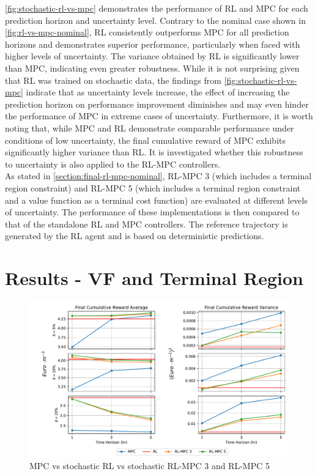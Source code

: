 \autoref{fig:stochastic-rl-vs-mpc} demonstrates the performance of RL and MPC for each prediction horizon and uncertainty level. Contrary to the nominal case shown in \ref{fig:rl-vs-mpc-nominal}, RL consistently outperforms MPC for all prediction horizons and demonstrates superior performance, particularly when faced with higher levels of uncertainty. The variance obtained by RL is significantly lower than MPC, indicating even greater robustness. While it is not surprising given that RL was trained on stochastic data, the findings from \autoref{fig:stochastic-rl-vs-mpc} indicate that as uncertainty levels increase, the effect of increasing the prediction horizon on performance improvement diminishes and may even hinder the performance of MPC in extreme cases of uncertainty. Furthermore, it is worth noting that, while MPC and RL demonstrate comparable performance under conditions of low uncertainty, the final cumulative reward of MPC exhibits significantly higher variance than RL. It is investigated whether this robustness to uncertainty is also applied to the RL-MPC controllers.\\
As stated in \autoref{section:final-rl-mpc-nominal}, RL-MPC 3 (which includes a terminal region constraint) and RL-MPC 5 (which includes a terminal region constraint and a value function as a terminal cost function) are evaluated at different levels of uncertainty. The performance of these implementations is then compared to that of the standalone RL and MPC controllers. The reference trajectory is generated by the RL agent and is based on deterministic predictions.

\section{Results - VF and Terminal Region}


\begin{figure}[H]
	\centering
	\includegraphics[width=\textwidth]{figures/stochastic_rl_vs_mpc_impl3.pdf}
	\caption{MPC vs stochastic RL vs stochastic RL-MPC 3 and RL-MPC 5}
	\label{fig:stochastic-mpv-vs-rl-rlmpc3-vs-rlmpc5}
\end{figure}


